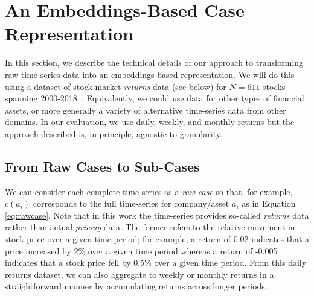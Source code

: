 \documentclass[runningheads]{llncs}
\begin{document}


\section{An Embeddings-Based Case Representation}\label{sec:methodology}
In this section, we describe the technical details of our approach to transforming raw time-series data into an embeddings-based representation. We will do this using a dataset of stock market \emph{returns} data (see below) for $N=611$ stocks spanning 2000-2018~\cite{dolphin2023machine}. Equivalently, we could use data for other types of financial assets, or more generally a variety of alternative time-series data from other domains. In our evaluation, we use daily, weekly, and monthly returns but the approach described is, in principle, agnostic to granularity. 





\subsection{From Raw Cases to Sub-Cases}
We can consider each complete time-series as a \emph{raw case} so that, for example, $c(a_i)$ corresponds to the full time-series for company/asset $a_i$ as in Equation \ref{eq:rawcase}. Note that in this work the time-series provides so-called \emph{returns} data rather than actual \emph{pricing} data.  The former refers to the relative movement in stock price over a given time period; for example, a return of 0.02 indicates that a price increased by 2\% over a given time period whereas a return of -0.005 indicates that a stock price fell by 0.5\% over a given time period. From this daily returns dataset, we can also aggregate to weekly or monthly returns in a straightforward manner by accumulating returns across longer periods.
\end{document}

